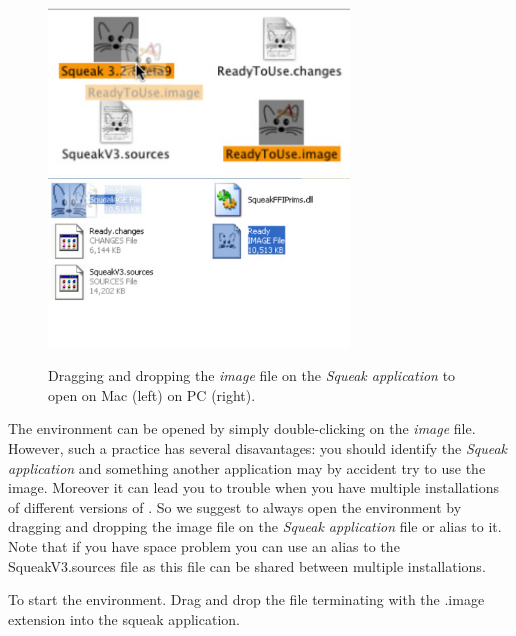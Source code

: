 \begin{figure}[!h]\centerline{\includegraphics[width=8cm]{dropImage}  \includegraphics[width=8cm]{readyDD}} 
\caption{Dragging and dropping the \textit{image} file on the 
\textit{Squeak application} to open on Mac (left) on PC (right).\label{fig:dropImage}}
\end{figure}


The environment can be opened by simply double-clicking on the \textit{image} file. However, such a practice has several disavantages: you should identify the \emph{Squeak application} and something another application may by accident try to use the image. Moreover it can lead you to trouble when you have multiple installations of different versions of \sq. So we suggest to always open the environment by dragging and dropping the image file on the \emph{Squeak application} file or alias to it. Note that if you have space problem you can use an alias to the SqueakV3.sources file as this file can be shared between multiple installations. 



\begin{largecadre}{To start the environment. 
Drag and drop the file terminating with the .image extension into the squeak application.}
\end{largecadre}
 